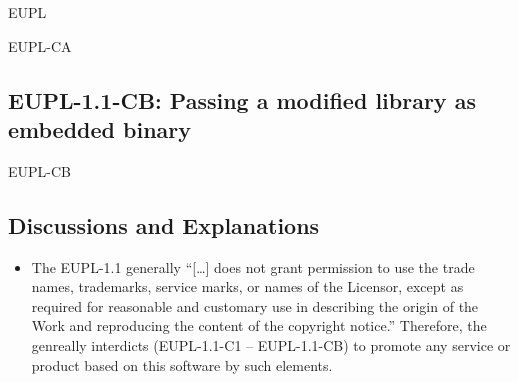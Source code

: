 \begin{license}{EUPL}
\begin{lsuc}{EUPL-CA}
\end{lsuc}

\subsection{EUPL-1.1-CB: Passing a modified library as embedded binary}
\begin{lsuc}{EUPL-CB}



  \begin{lsucrequires}
    \lsucmandatory{\keepLicensingElements \addWhenCompiling}
    \lsucmandatory{\giveLicense}\passingFilesCorrectly
    \lsucmandatory{\addModificationTextFile}
    \lsucmandatory{\makeAllSourcesAvailable}
    \lsucmandatory{\mentionRepositoryInDocumentation}
    \lsucmandatory{\arrangeBinaryModifications}
    \lsucmandatory{\applyCopyleftToBinaries}
    \lsucoptional{\markAllEmbeddedModifications}
    \lsucoptional{\addToYourCopyrightNotice}
  \end{lsucrequires}

  \begin{lsucprohibits}
    \lsucitem{\noTrademarks}
  \end{lsucprohibits}

\end{lsuc}

\subsection{Discussions and Explanations}
\begin{itemize}
  
\item The EUPL-1.1 generally \enquote{[\ldots] does not grant permission to use
  the trade names, trademarks, service marks, or names of the Licensor, except
  as required for reasonable and customary use in describing the origin of the
  Work and reproducing the content of the copyright notice.} 
  Therefore, the \oslic{} genreally interdicts (EUPL-1.1-C1 -- EUPL-1.1-CB) to promote any
  service or product based on this software by such elements. 


\end{itemize}
\end{license}
